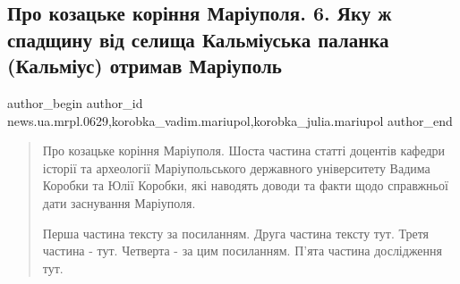  
 
 
 
 
 
\subsection{Про козацьке коріння Маріуполя. 6. Яку ж спадщину від селища Кальміуська паланка (Кальміус) отримав Маріуполь}
\label{sec:09_09_2023.stz.news.ua.mrpl.0629.1.pro_kozacke_korinnja_mariupolja_6}
 
\ifcmt
 author_begin
   author_id news.ua.mrpl.0629,korobka_vadim.mariupol,korobka_julia.mariupol
 author_end
\fi

\begin{quote}
Про козацьке коріння Маріуполя. Шоста частина статті доцентів кафедри історії
та археології Маріупольського державного університету Вадима Коробки та Юлії
Коробки, які наводять доводи та факти щодо справжньої дати заснування
Маріуполя. 

Перша частина тексту за посиланням. Друга частина тексту тут. Третя частина -
тут. Четверта - за цим посиланням. П'ята частина дослідження тут.
\end{quote}
